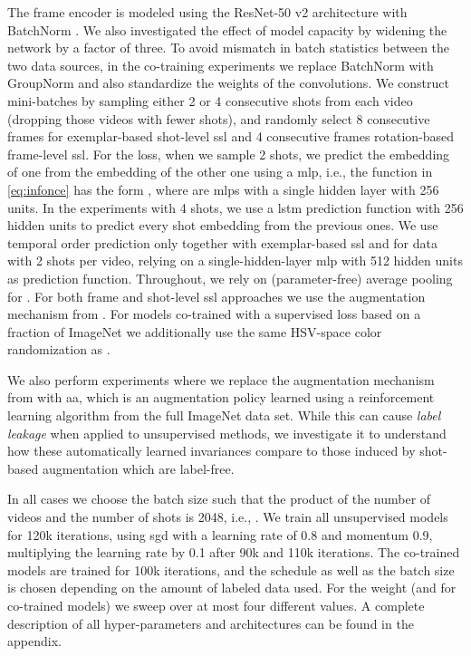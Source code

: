 \documentclass[10pt,twocolumn,letterpaper]{article}
\renewcommand{\paragraph}[1]{\noindent{\bf #1}\quad}
\begin{document}
{\paragraph{Architectures and training details} The frame encoder  is modeled using the ResNet-50 v2 \cite{he2016identity} architecture with BatchNorm \cite{ioffe2015batch}.
We also investigated the effect of model capacity by widening the network by a factor of three.
To avoid mismatch in batch statistics between the two data sources, in the co-training experiments we replace BatchNorm with GroupNorm \cite{wu2018group} and also standardize \cite{qiao2019weight} the weights of the convolutions.
We construct mini-batches by sampling either 2 or 4 consecutive shots from each video (dropping those videos with fewer shots),
and randomly select 8 consecutive frames for exemplar-based shot-level \gls{ssl} and 4 consecutive frames rotation-based frame-level \gls{ssl}.
For the  loss, when we sample 2 shots, we predict the embedding of one from the embedding of the other one using a \gls{mlp}, i.e., the function  in \eqref{eq:infonce} has the form , where  are \glspl{mlp} with a single hidden layer with 256 units.
In the experiments with 4 shots, we use a \gls{lstm} prediction function with 256 hidden units to predict every shot embedding from the previous ones.
We use temporal order prediction only together with exemplar-based \gls{ssl} and for data with 2 shots per video, relying on a single-hidden-layer \gls{mlp} with 512 hidden units as prediction function.
Throughout, we rely on (parameter-free) average pooling for . For both frame and shot-level \gls{ssl} approaches we use the augmentation mechanism from \cite{szegedy2015going}. For models co-trained with a supervised loss based on a fraction of ImageNet we additionally use the same HSV-space color randomization as \cite{zhai2019s4l}.

We also perform experiments where we replace the augmentation mechanism from \cite{szegedy2015going} with \gls{aa}, which is an augmentation policy learned using a reinforcement learning algorithm from the full ImageNet data set. While this can cause \emph{label leakage} when applied to unsupervised methods, we investigate it to understand how these automatically learned invariances compare to those induced by shot-based augmentation which are label-free.


In all cases we choose the batch size such that the product of the number of videos and the number of shots is 2048, i.e., . We train all unsupervised models for 120k iterations, using \gls{sgd} with a learning rate of 0.8 and momentum 0.9, multiplying the learning rate by 0.1 after 90k and 110k iterations. The co-trained models are trained for 100k iterations, and the schedule as well as the batch size is chosen depending on the amount of labeled data used. For the weight  (and  for co-trained models) we sweep over at most four different values. A complete description of all hyper-parameters and architectures can be found in the appendix.


}
\end{document}
